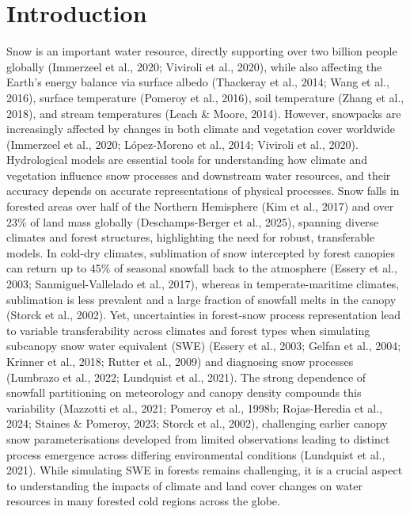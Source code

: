 \documentclass[
  letterpaper,
]{tex/uofsthesis-cs}
\begin{document}
\section{Introduction}\label{introduction-4}

Snow is an important water resource, directly supporting over two
billion people globally (Immerzeel et al., 2020; Viviroli et al., 2020),
while also affecting the Earth's energy balance via surface albedo
(Thackeray et al., 2014; Wang et al., 2016), surface temperature
(Pomeroy et al., 2016), soil temperature (Zhang et al., 2018), and
stream temperatures (Leach \& Moore, 2014). However, snowpacks are
increasingly affected by changes in both climate and vegetation cover
worldwide (Immerzeel et al., 2020; López-Moreno et al., 2014; Viviroli
et al., 2020). Hydrological models are essential tools for understanding
how climate and vegetation influence snow processes and downstream water
resources, and their accuracy depends on accurate representations of
physical processes. Snow falls in forested areas over half of the
Northern Hemisphere (Kim et al., 2017) and over 23\% of land mass
globally (Deschamps-Berger et al., 2025), spanning diverse climates and
forest structures, highlighting the need for robust, transferable
models. In cold-dry climates, sublimation of snow intercepted by forest
canopies can return up to 45\% of seasonal snowfall back to the
atmosphere (Essery et al., 2003; Sanmiguel-Vallelado et al., 2017),
whereas in temperate-maritime climates, sublimation is less prevalent
and a large fraction of snowfall melts in the canopy (Storck et al.,
2002). Yet, uncertainties in forest-snow process representation lead to
variable transferability across climates and forest types when
simulating subcanopy snow water equivalent (SWE) (Essery et al., 2003;
Gelfan et al., 2004; Krinner et al., 2018; Rutter et al., 2009) and
diagnosing snow processes (Lumbrazo et al., 2022; Lundquist et al.,
2021). The strong dependence of snowfall partitioning on meteorology and
canopy density compounds this variability (Mazzotti et al., 2021;
Pomeroy et al., 1998b; Rojas-Heredia et al., 2024; Staines \& Pomeroy,
2023; Storck et al., 2002), challenging earlier canopy snow
parameterisations developed from limited observations leading to
distinct process emergence across differing environmental conditions
(Lundquist et al., 2021). While simulating SWE in forests remains
challenging, it is a crucial aspect to understanding the impacts of
climate and land cover changes on water resources in many forested cold
regions across the globe.
\end{document}
